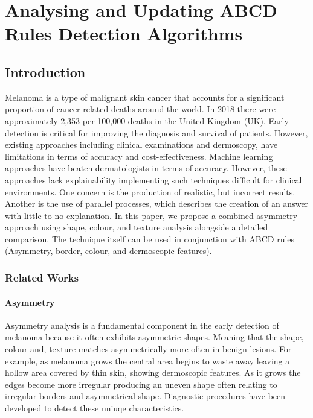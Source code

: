 \chapter{Analysing and Updating ABCD Rules Detection Algorithms}

\section{Introduction}

Melanoma is a type of malignant skin cancer that accounts for a significant proportion of cancer-related deaths around the world. In 2018 there were approximately 2,353 per 100,000 deaths in the United Kingdom (UK)\cite{UK2019}. Early detection is critical for improving the diagnosis and survival of patients. However, existing approaches including clinical examinations and dermoscopy, have limitations in terms of accuracy and cost-effectiveness\cite{Takiddin2021}. Machine learning approaches have beaten dermatologists in terms of accuracy\cite{Andre2017}. However, these approaches lack explainability implementing such techniques difficult for clinical environments\cite{Fan2017}. One concern is the production of realistic, but incorrect results\cite{Ghorbani2019}. Another is the use of parallel processes, which describes the creation of an answer with little to no explanation. In this paper, we propose a combined asymmetry approach using shape, colour, and texture analysis alongside a detailed comparison. The technique itself can be used in conjunction with ABCD rules (Asymmetry, border, colour, and dermoscopic features).

\subsection{Related Works}

\subsubsection{Asymmetry}
Asymmetry analysis is a fundamental component in the early detection of melanoma because it often exhibits asymmetric shapes\cite{Ali2020a}. Meaning that the shape, colour and, texture matches asymmetrically more often in benign lesions. For example, as melanoma grows the central area begins to waste away leaving a hollow area covered by thin skin, showing dermoscopic features. As it grows the edges become more irregular producing an uneven shape often relating to irregular borders and asymmetrical shape. Diagnostic procedures have been developed to detect these uniuqe characteristics.

